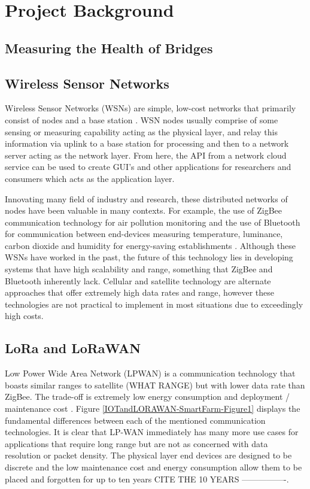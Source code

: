 \section{Project Background}
\subsection{Measuring the Health of Bridges}


\subsection{Wireless Sensor Networks}
Wireless Sensor Networks (WSNs) are simple, low-cost networks that primarily consist of nodes and a base station \cite{WSN-WaterQual}. WSN nodes usually comprise of some sensing or measuring capability acting as the physical layer, and relay this information via uplink to a base station for processing and then to a network server acting as the network layer. From here, the API from a network cloud service can be used to create GUI's and other applications for researchers and consumers which acts as the application layer. 

Innovating many field of industry and research, these distributed networks of nodes have been valuable in many contexts. For example, the use of ZigBee communication technology for air pollution monitoring \cite{ZigBeeAirPolution} and the use of Bluetooth for communication between end-devices measuring temperature, luminance, carbon dioxide and humidity for energy-saving establishments \cite{BTenergySaving}. Although these WSNs have worked in the past, the future of this technology lies in developing systems that have high scalability and range, something that ZigBee and Bluetooth inherently lack. Cellular and satellite technology are alternate approaches that offer extremely high data rates and range, however these technologies are not practical to implement in most situations due to exceedingly high costs. 

\subsection{LoRa and LoRaWAN}
Low Power Wide Area Network (LPWAN) is a communication technology that boasts similar ranges to satellite (WHAT RANGE) but with lower data rate than ZigBee. The trade-off is extremely low energy consumption and deployment / maintenance cost \cite{IOTandLORAWAN-SmartFarm}. Figure \ref{IOTandLORAWAN-SmartFarm-Figure1} displays the fundamental differences between each of the mentioned communication technologies. It is clear that LP-WAN immediately has many more use cases for applications that require long range but are not as concerned with data resolution or packet density. The physical layer end devices are designed to be discrete and the low maintenance cost and energy consumption allow them to be placed and forgotten for up to ten years CITE THE 10 YEARS ----------------.


